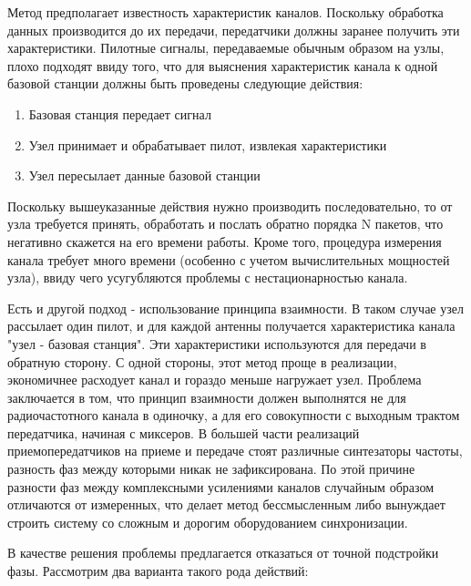 \documentclass[a4paper,12pt,oneside]{scrartcl}
\begin{document}
Метод предполагает известность характеристик каналов. 
Поскольку обработка данных производится до их передачи, передатчики должны заранее получить эти характеристики. 
Пилотные сигналы, передаваемые обычным образом на узлы, плохо подходят ввиду того, что для выяснения характеристик канала к одной базовой станции должны быть проведены следующие действия:
\begin{enumerate}
\item Базовая станция передает сигнал
\item Узел принимает и обрабатывает пилот, извлекая характеристики
\item Узел пересылает данные базовой станции
\end{enumerate}
Поскольку вышеуказанные действия нужно производить последовательно, то от узла требуется принять, обработать и послать обратно порядка N пакетов, что негативно скажется на его времени работы. 
Кроме того, процедура измерения канала требует много времени (особенно с учетом вычислительных мощностей узла), ввиду чего усугубляются проблемы с нестационарностью канала.

Есть и другой подход - использование принципа взаимности. 
В таком случае узел рассылает один пилот, и для каждой антенны получается характеристика канала "узел - базовая станция". 
Эти характеристики используются для передачи в обратную сторону. 
С одной стороны, этот метод проще в реализации, экономичнее расходует канал и гораздо меньше нагружает узел. 
Проблема заключается в том, что принцип взаимности должен выполнятся не для радиочастотного канала в одиночку, а для его совокупности с выходным трактом передатчика, начиная с миксеров. 
В большей части реализаций приемопередатчиков на приеме и передаче стоят различные синтезаторы частоты, разность фаз между которыми никак не зафиксирована. 
По этой причине разности фаз между комплексными усилениями каналов случайным образом отличаются от измеренных, что делает метод бессмысленным либо вынуждает строить систему со сложным и дорогим оборудованием синхронизации.

В качестве решения проблемы предлагается отказаться от точной подстройки фазы. Рассмотрим два варианта такого рода действий:
\end{document}
